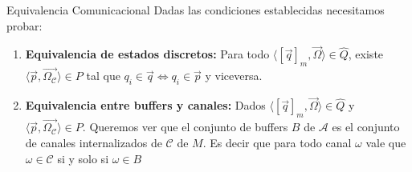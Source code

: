 \documentclass[10pt,xcolor={table,dvipsnames},t]{beamer}
\begin{document}
\begin{frame}{Equivalencia Comunicacional}
Dadas las condiciones establecidas necesitamos probar:
\begin{enumerate}
    \item \textbf{Equivalencia de estados discretos:} Para todo $\langle [\overrightarrow{q}]_m, \overrightarrow{\Omega} \rangle \in \widehat{Q}$, existe $\langle \overrightarrow{p}, \overrightarrow{\Omega_{\mathcal{C}}} \rangle \in P$ tal que $q_i \in \overrightarrow{q} \iff q_i \in \overrightarrow{p}$ y viceversa.
    \item \textbf{Equivalencia entre buffers y canales:} Dados $\langle [\overrightarrow{q}]_m, \overrightarrow{\Omega} \rangle \in \widehat{Q}$ y $\langle \overrightarrow{p}, \overrightarrow{\Omega_{\mathcal{C}}} \rangle \in P$. Queremos ver que el conjunto de buffers $B$ de $\mathcal{A}$ es el conjunto de canales internalizados de $\mathcal{C}$ de $M$. Es decir que para todo canal $\omega$ vale que $\omega \in \mathcal{C}$ si y solo si $\omega \in B$
\end{enumerate}
    
\end{frame}



\end{document}
